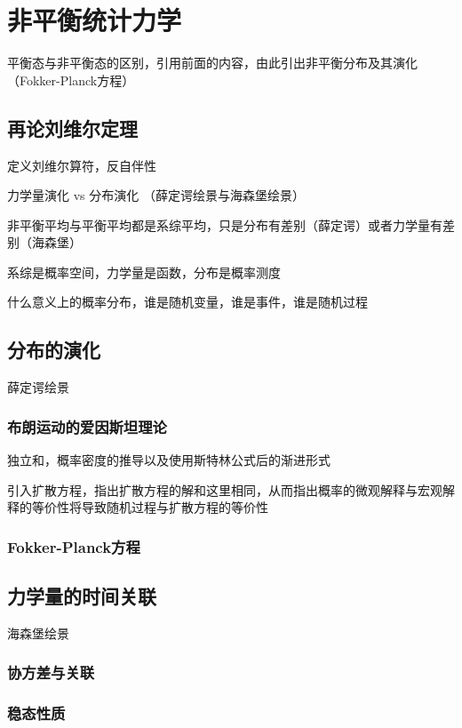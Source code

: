 \chapter{非平衡统计力学}

平衡态与非平衡态的区别，引用前面的内容，由此引出非平衡分布及其演化（Fokker-Planck方程）

\section{再论刘维尔定理}

定义刘维尔算符，反自伴性

力学量演化 vs 分布演化 （薛定谔绘景与海森堡绘景）

非平衡平均与平衡平均都是系综平均，只是分布有差别（薛定谔）或者力学量有差别（海森堡）

系综是概率空间，力学量是函数，分布是概率测度

什么意义上的概率分布，谁是随机变量，谁是事件，谁是随机过程

\section{分布的演化}
薛定谔绘景
\subsection{布朗运动的爱因斯坦理论}
独立和，概率密度的推导以及使用斯特林公式后的渐进形式

引入扩散方程，指出扩散方程的解和这里相同，从而指出概率的微观解释与宏观解释的等价性将导致随机过程与扩散方程的等价性

\subsection{Fokker-Planck方程}


\section{力学量的时间关联}
海森堡绘景

\subsection{协方差与关联}

\subsection{稳态性质}


